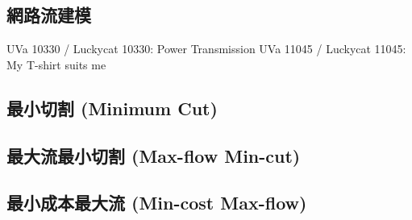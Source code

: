 \documentclass[12pt,a4paper,oneside]{report}
\begin{document}
\begin{CJK}{UTF8}{bkai}
\subsection{網路流建模}

UVa 10330 / Luckycat 10330: Power Transmission
UVa 11045 / Luckycat 11045: My T-shirt suits me

\subsection{最小切割 (Minimum Cut)}
\subsection{最大流最小切割 (Max-flow Min-cut)}
\subsection{最小成本最大流 (Min-cost Max-flow)}
\ifx \allfiles \undefined
\printindex[noun]

\clearpage
\end{CJK}
\end{document}
